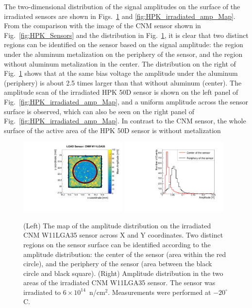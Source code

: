 \documentclass[preprint,1p]{elsarticle}
\begin{document}
The two-dimensional distribution of the signal amplitudes on the surface of the
irradiated sensors are shown in Figs.~\ref{fig:CNM_irradiated_amp_Map} and
\ref{fig:HPK_irradiated_amp_Map}. From the comparison with the image of the CNM
sensor shown in Fig.~\ref{fig:HPK_Sensors} and the distribution in
Fig.~\ref{fig:CNM_irradiated_amp_Map}, it is clear that two distinct regions can
be identified on the sensor based on the signal amplitude: the region under the
aluminum metalization on the periphery of the sensor, and the region without
aluminum metalization in the center. The distribution on the right of
Fig.~\ref{fig:CNM_irradiated_amp_Map} shows that at the same bias voltage the amplitude under the
aluminum (periphery) is about 2.5 times larger than that without aluminum
(center). The amplitude scan of the irradiated HPK 50D sensor is shown on the
left panel of Fig.~\ref{fig:HPK_irradiated_amp_Map}, and a uniform amplitude
across the sensor surface is observed, which can also be seen on the right panel
of Fig.~\ref{fig:HPK_irradiated_amp_Map}. In contrast to the CNM sensor, the
whole surface of the active area of the HPK 50D sensor is without metalization


\begin{figure}[htbp] 
\centering
\includegraphics[width=0.48\textwidth]{figs/USCSBoard_HPK50DIrradiated-CNMW11LGA35_Run936-961/CNM_irradiated_amp_Map.pdf} \hfill
\includegraphics[width=0.48\textwidth]{figs/USCSBoard_HPK50DIrradiated-CNMW11LGA35_Run936-961/CNM_irradiated_amp_1D.pdf} 
\caption{(Left) The map of the amplitude distribution on the irradiated CNM W11LGA35 sensor across X and Y coordinates. Two distinct regions on the sensor surface can be identified according to the amplitude distribution: the center of the sensor (area within the red circle), and the periphery of the sensor (area between the black circle and black square). (Right) Amplitude distribution in the two areas of the irradiated CNM W11LGA35 sensor. The sensor was irradiated to $6\times 10^{14}$~n/cm$^2$. Measurements were performed at $-20^{\circ}$C.} 
\label{fig:CNM_irradiated_amp_Map} 
\end{figure} 
\end{document}
